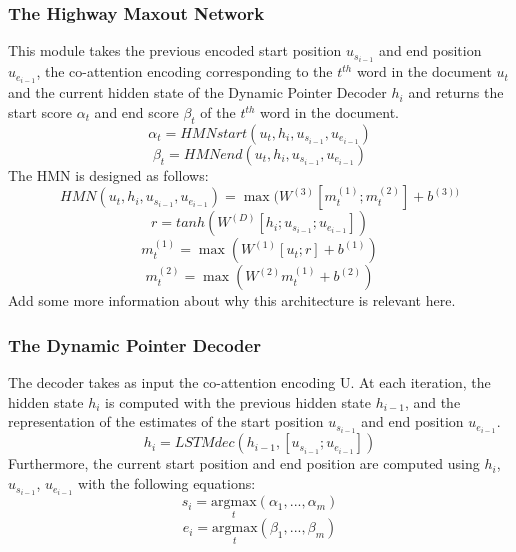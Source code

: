 \documentclass[letterpaper, 10 pt, conference]{ieeeconf}  %
\begin{document}
\subsubsection{The Highway Maxout Network}
This module takes the previous encoded start position $u_{s_{i-1}}$ and end position $u_{e_{i-1}}$, the co-attention encoding corresponding to the $t^{th}$ word in the document $u_{t}$ and the current hidden state of the Dynamic Pointer Decoder $h_i$ and returns the start score $\alpha_t$ and end score $\beta_t$ of the $t^{th}$ word in the document.
\begin{equation}
\alpha_t= HMNstart(u_t,h_i,u_{s_{i-1}},u_{e_{i-1}})
\end{equation}
\begin{equation}
\beta_t= HMNend(u_t,h_i,u_{s_{i-1}},u_{e_{i-1}})
\end{equation}
The HMN is designed as follows:
\begin{equation}
HMN(u_t,h_i,u_{s_{i-1}},u_{e_{i-1}})=  \max(W^{(3)}[m^{(1)}_t;m^{(2)}_t]+b^{(3))}
\end{equation}
\begin{equation}
r=  tanh(W^{(D)}[h_i;u_{s_{i-1}};u_{e_{i-1}}])
\end{equation}
\begin{equation}
m^{(1)}_t=  \max(W^{(1)}[u_t;r] +b^{(1)})
\end{equation}
\begin{equation}
m^{(2)}_t=  \max(W^{(2)}m^{(1)}_t+b^{(2)})
\end{equation}
Add some more information about why this architecture is relevant here.\\

\subsubsection{The Dynamic Pointer Decoder}

The decoder takes as input the co-attention encoding U. At each iteration, the hidden state $h_i$ is computed with the previous hidden state $h_{i-1}$, and the representation of the estimates of the start position $u_{s_{i-1}}$ and end position $u_{e_{i-1}}$.
\begin{equation}
h_i= LSTMdec(h_{i-1},[u_{s_{i-1}};u_{e_{i-1}}])
\end{equation}
Furthermore, the current start position and end position are computed using $h_i$, $u_{s_{i-1}}$, $u_{e_{i-1}}$ with the following equations: 
\begin{equation}
s_i= \underset{t}{\mathrm{argmax}}(\alpha_1,...,\alpha_m)
\end{equation}
\begin{equation}
e_i= \underset{t}{\mathrm{argmax}}(\beta_1,...,\beta_m)
\end{equation}
\end{document}
